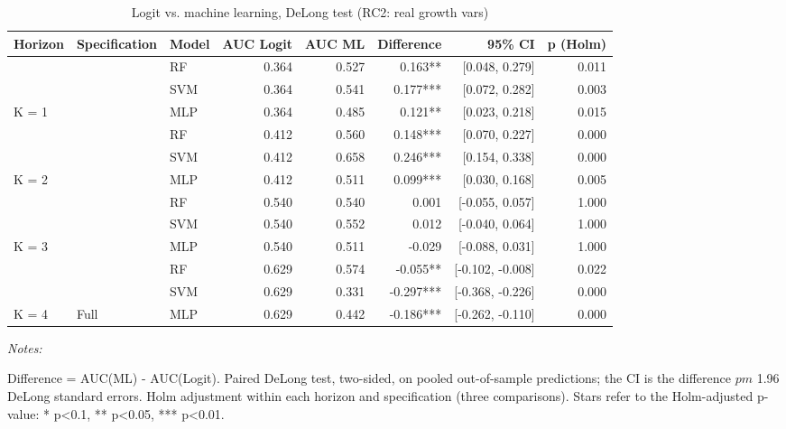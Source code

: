 \begin{table}

\caption{\label{tab:delong_rc2}Logit vs. machine learning, DeLong test (RC2: real growth vars)}
\centering
\begin{threeparttable}
\begin{tabular}[t]{lllrrrrr}
\toprule
Horizon & Specification & Model & AUC Logit & AUC ML & Difference & 95\% CI & p (Holm)\\
\midrule
 &  & RF & 0.364 & 0.527 & 0.163** & {}[0.048, 0.279] & 0.011\\

 &  & SVM & 0.364 & 0.541 & 0.177*** & {}[0.072, 0.282] & 0.003\\

\multirow[t]{-2}{*}[\normalbaselineskip]{\raggedright\arraybackslash K = 1} &  & MLP & 0.364 & 0.485 & 0.121** & {}[0.023, 0.218] & 0.015\\

 &  & RF & 0.412 & 0.560 & 0.148*** & {}[0.070, 0.227] & 0.000\\

 &  & SVM & 0.412 & 0.658 & 0.246*** & {}[0.154, 0.338] & 0.000\\

\multirow[t]{-2}{*}[\normalbaselineskip]{\raggedright\arraybackslash K = 2} &  & MLP & 0.412 & 0.511 & 0.099*** & {}[0.030, 0.168] & 0.005\\

 &  & RF & 0.540 & 0.540 & 0.001 & {}[-0.055, 0.057] & 1.000\\

 &  & SVM & 0.540 & 0.552 & 0.012 & {}[-0.040, 0.064] & 1.000\\

\multirow[t]{-2}{*}[\normalbaselineskip]{\raggedright\arraybackslash K = 3} &  & MLP & 0.540 & 0.511 & -0.029 & {}[-0.088, 0.031] & 1.000\\

 &  & RF & 0.629 & 0.574 & -0.055** & {}[-0.102, -0.008] & 0.022\\

 &  & SVM & 0.629 & 0.331 & -0.297*** & {}[-0.368, -0.226] & 0.000\\

\multirow[t]{-2}{*}[\normalbaselineskip]{\raggedright\arraybackslash K = 4} & \multirow[t]{-11}{*}[\normalbaselineskip]{\raggedright\arraybackslash Full} & MLP & 0.629 & 0.442 & -0.186*** & {}[-0.262, -0.110] & 0.000\\
\bottomrule
\end{tabular}
\begin{tablenotes}
\item \textit{Notes: } 
\item Difference = AUC(ML) - AUC(Logit). Paired DeLong test, two-sided, on pooled out-of-sample predictions; the CI is the difference $pm$ 1.96 DeLong standard errors. Holm adjustment within each horizon and specification (three comparisons). Stars refer to the Holm-adjusted p-value: * p<0.1, ** p<0.05, *** p<0.01.
\end{tablenotes}
\end{threeparttable}
\end{table}

